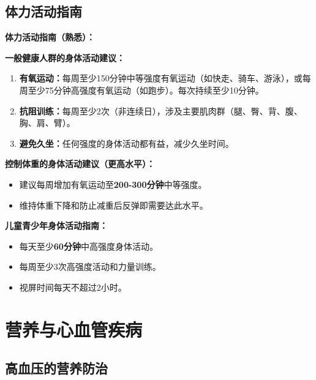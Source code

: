 \subsection{体力活动指南}

\begin{tipbox}
\textbf{体力活动指南（熟悉）：}

\textbf{一般健康人群的身体活动建议：}
\begin{enumerate}[leftmargin=*]
    \item \textbf{有氧运动：}每周至少150分钟中等强度有氧运动（如快走、骑车、游泳），或每周至少75分钟高强度有氧运动（如跑步）。每次持续至少10分钟。
    \item \textbf{抗阻训练：}每周至少2次（非连续日），涉及主要肌肉群（腿、臀、背、腹、胸、肩、臂）。
    \item \textbf{避免久坐：}任何强度的身体活动都有益，减少久坐时间。
\end{enumerate}

\textbf{控制体重的身体活动建议（更高水平）：}
\begin{itemize}[leftmargin=*]
    \item 建议每周增加有氧运动至\textbf{200-300分钟}中等强度。
    \item 维持体重下降和防止减重后反弹即需要达此水平。
\end{itemize}

\textbf{儿童青少年身体活动指南：}
\begin{itemize}[leftmargin=*]
    \item 每天至少\textbf{60分钟}中高强度身体活动。
    \item 每周至少3次高强度活动和力量训练。
    \item 视屏时间每天不超过2小时。
\end{itemize}
\end{tipbox}

\section{营养与心血管疾病}

\subsection{高血压的营养防治}

